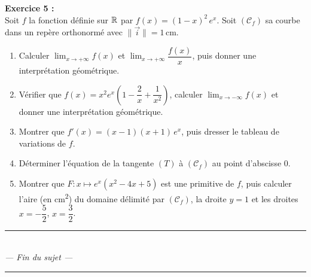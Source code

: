 \medskip

\noindent\textbf{Exercice 5 :}\\
Soit $f$ la fonction d\'{e}finie sur $\mathbb{R}$ par $f(x) = (1-x)^2\,e^x$.
Soit $(\mathcal{C}_f)$ sa courbe dans un rep\`{e}re orthonorm\'{e}
avec $\|\vec{i}\| = 1\,\text{cm}$.

\begin{enumerate}[leftmargin=1.5em, label=\textbf{\arabic*.}, itemsep=2pt, topsep=4pt]
  \item Calculer $\displaystyle\lim_{x \to +\infty} f(x)$ et
        $\displaystyle\lim_{x \to +\infty} \dfrac{f(x)}{x}$,
        puis donner une interpr\'{e}tation g\'{e}om\'{e}trique.
  \item V\'{e}rifier que $f(x) = x^2 e^x\!\left(1 - \dfrac{2}{x} + \dfrac{1}{x^2}\right)$,
        calculer $\displaystyle\lim_{x \to -\infty} f(x)$ et donner une interpr\'{e}tation
        g\'{e}om\'{e}trique.
  \item Montrer que $f'(x) = (x-1)(x+1)\,e^x$, puis dresser le tableau de variations de $f$.
  \item D\'{e}terminer l'\'{e}quation de la tangente $(T)$ \`{a} $(\mathcal{C}_f)$
        au point d'abscisse $0$.
  \item Montrer que $F : x \mapsto e^x(x^2 - 4x + 5)$ est une primitive de $f$,
        puis calculer l'aire (en cm\textsuperscript{2}) du domaine d\'{e}limit\'{e}
        par $(\mathcal{C}_f)$, la droite $y = 1$ et les droites
        $x = -\dfrac{5}{2}$, $x = \dfrac{3}{2}$.
\end{enumerate}

\begin{center}
  \color{charcoal}\rule{5cm}{0.4pt}\\[3pt]
  \textit{--- Fin du sujet ---}\\
  \rule{5cm}{0.4pt}
\end{center}
